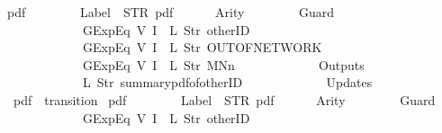 \begin{isabellebody}
{\isachardoublequoteopen}pdf{}\ {\isasymequiv}\ {\isasymlparr}\isanewline
\ \ \ \ \ \ Label\ {\isacharequal}\ STR\ {\isacharprime}{\isacharprime}pdf{\isacharprime}{\isacharprime}{\isacharcomma}\isanewline
\ \ \ \ \ \ Arity\ {\isacharequal}\ {}{\isacharcomma}\isanewline
\ \ \ \ \ \ Guard\ {\isacharequal}\ {\isacharbrackleft}\isanewline
\ \ \ \ \ \ \ \ \ \ \ \ GExp{\isachardot}Eq\ {\isacharparenleft}V\ {\isacharparenleft}I\ {}{\isacharparenright}{\isacharparenright}\ {\isacharparenleft}L\ {\isacharparenleft}Str\ {\isacharprime}{\isacharprime}otherID{\isacharprime}{\isacharprime}{\isacharparenright}{\isacharparenright}{\isacharcomma}\isanewline
\ \ \ \ \ \ \ \ \ \ \ \ GExp{\isachardot}Eq\ {\isacharparenleft}V\ {\isacharparenleft}I\ {}{\isacharparenright}{\isacharparenright}\ {\isacharparenleft}L\ {\isacharparenleft}Str\ {\isacharprime}{\isacharprime}OUT{\isacharunderscore}OF{\isacharunderscore}NETWORK{\isacharprime}{\isacharprime}{\isacharparenright}{\isacharparenright}{\isacharcomma}\isanewline
\ \ \ \ \ \ \ \ \ \ \ \ GExp{\isachardot}Eq\ {\isacharparenleft}V\ {\isacharparenleft}I\ {}{\isacharparenright}{\isacharparenright}\ {\isacharparenleft}L\ {\isacharparenleft}Str\ {\isacharprime}{\isacharprime}MNn{}{\isacharprime}{\isacharprime}{\isacharparenright}{\isacharparenright}\isanewline
\ \ \ \ \ \ {\isacharbrackright}{\isacharcomma}\isanewline
\ \ \ \ \ \ Outputs\ {\isacharequal}\ {\isacharbrackleft}\isanewline
\ \ \ \ \ \ \ \ \ \ \ \ {\isacharparenleft}L\ {\isacharparenleft}Str\ {\isacharprime}{\isacharprime}summary{\isacharunderscore}pdf{\isacharunderscore}of{\isacharunderscore}otherID{\isacharprime}{\isacharprime}{\isacharparenright}{\isacharparenright}\isanewline
\ \ \ \ \ \ {\isacharbrackright}{\isacharcomma}\isanewline
\ \ \ \ \ \ Updates\ {\isacharequal}\ {\isacharbrackleft}{\isacharbrackright}\isanewline
{\isasymrparr}{\isachardoublequoteclose}\isanewline
\isanewline
{}\isamarkupfalse%
\ {\isachardoublequoteopen}pdf{}{\isachardoublequoteclose}\ {\isacharcolon}{\isacharcolon}\ {\isachardoublequoteopen}transition{\isachardoublequoteclose}\ \isanewline
{\isachardoublequoteopen}pdf{}\ {\isasymequiv}\ {\isasymlparr}\isanewline
\ \ \ \ \ \ Label\ {\isacharequal}\ STR\ {\isacharprime}{\isacharprime}pdf{\isacharprime}{\isacharprime}{\isacharcomma}\isanewline
\ \ \ \ \ \ Arity\ {\isacharequal}\ {}{\isacharcomma}\isanewline
\ \ \ \ \ \ Guard\ {\isacharequal}\ {\isacharbrackleft}\isanewline
\ \ \ \ \ \ \ \ \ \ \ \ GExp{\isachardot}Eq\ {\isacharparenleft}V\ {\isacharparenleft}I\ {}{\isacharparenright}{\isacharparenright}\ {\isacharparenleft}L\ {\isacharparenleft}Str\ {\isacharprime}{\isacharprime}otherID{\isacharprime}{\isacharprime}{\isacharparenright}{\isacharparenright}{\isacharcomma}\isanewline

\end{isabellebody}
